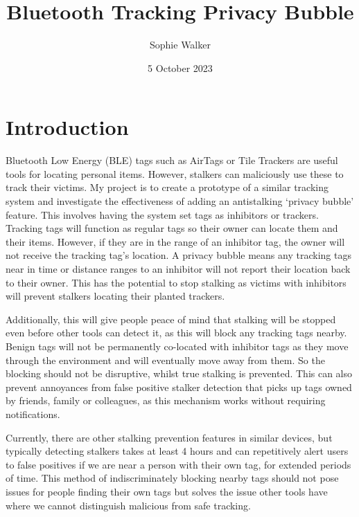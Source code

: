 \documentclass{article}
\begin{document}
\title{Bluetooth Tracking Privacy Bubble}
\author{Sophie Walker}
\date{5 October 2023}
\maketitle
\thispagestyle{empty}
\section{Introduction}




Bluetooth Low Energy (BLE) tags such as AirTags or Tile Trackers are useful tools for locating personal items. However, stalkers can  maliciously use these to track their victims.  My project is to create a prototype of a similar tracking system and investigate the effectiveness of adding an antistalking `privacy bubble' feature. This involves having the system set tags as inhibitors or trackers. Tracking tags will function as regular tags so their owner can locate them and their items. However, if they are in the range of an inhibitor tag,  the owner will not receive the tracking tag's location. A privacy bubble means any tracking tags near in time or distance ranges to an inhibitor will not report their location back to their owner. This has the potential to stop stalking as victims with inhibitors will prevent stalkers locating their planted trackers.
\par
Additionally, this will give people peace of mind that stalking will be stopped even before other tools can detect it, as this will block any tracking tags nearby. Benign tags will not be permanently co-located with inhibitor tags as they move through the environment and will eventually move away from them. So the blocking should not be disruptive, whilst true stalking is prevented. This can also prevent annoyances from false positive stalker detection that picks up tags owned by friends, family or colleagues, as this mechanism works without requiring notifications.
\par
Currently, there are other stalking prevention features in similar devices, but typically detecting stalkers takes at least 4 hours \cite{Failuresof ASProtocols} and can repetitively alert users to false positives if we are near a person with their own tag, for extended periods of time. This method of indiscriminately blocking nearby tags should not pose issues for people finding their own tags but solves the issue other tools have where we cannot distinguish malicious from safe tracking.
\end{document}
